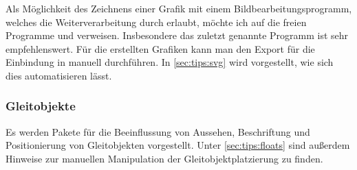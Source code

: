 %
Als Möglichkeit des Zeichnens einer Grafik mit einem Bildbearbeitungsprogramm, 
welches die Weiterverarbeitung durch  erlaubt, möchte ich auf die 
freien Programme  und  verweisen. 
Insbesondere das zuletzt genannte Programm ist sehr empfehlenswert. Für die 
erstellten Grafiken kann man den Export für die Einbindung in  
manuell durchführen. In \autoref{sec:tips:svg} wird vorgestellt, wie sich dies 
automatisieren lässt.

\subsubsection{Gleitobjekte}
Es werden Pakete für die Beeinflussung von Aussehen, Beschriftung und 
Positionierung von Gleitobjekten vorgestellt. Unter \autoref{sec:tips:floats} 
sind außerdem Hinweise zur manuellen Manipulation der Gleitobjektplatzierung zu 
finden.


